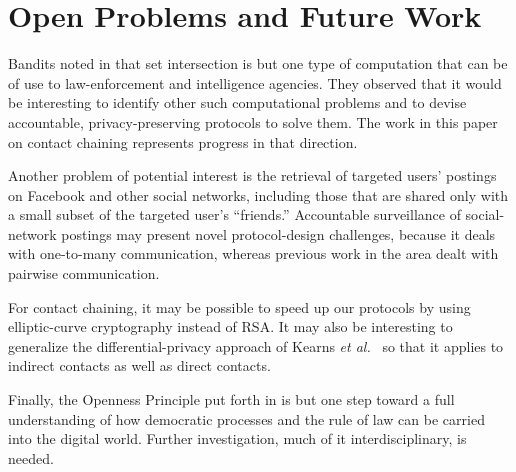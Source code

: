\section{Open Problems and Future Work}\label{sec-future}
Bandits noted in \cite[Section 6.1]{sff-foci2014} that
set intersection is but one type of computation that can be of use
to law-enforcement and intelligence agencies.  They observed that it 
would be interesting to identify other such computational problems 
and to devise accountable, privacy-preserving protocols to solve them.  
The work in this paper on contact chaining represents progress in that
direction.  

Another problem of potential interest is the retrieval of
targeted users' postings on Facebook and other social networks, including 
those that are shared only with a small subset of the targeted user's 
``friends.'' Accountable surveillance of social-network postings may present 
novel protocol-design challenges, because it deals with one-to-many 
communication, whereas previous work in the area dealt with pairwise 
communication.

For contact chaining, it may be possible to speed up our protocols by using
elliptic-curve cryptography instead of RSA.  It may also be interesting to 
generalize the differential-privacy approach of Kearns {\it et 
al.}~\cite{krwy-pnas16} so that it applies to indirect contacts as well as
direct contacts. 

Finally, the Openness Principle put forth in \cite{sff-foci2014} is but one step
toward a full understanding of how democratic processes and the rule of law
can be carried into the digital world.  Further investigation, much of it
interdisciplinary, is needed.

